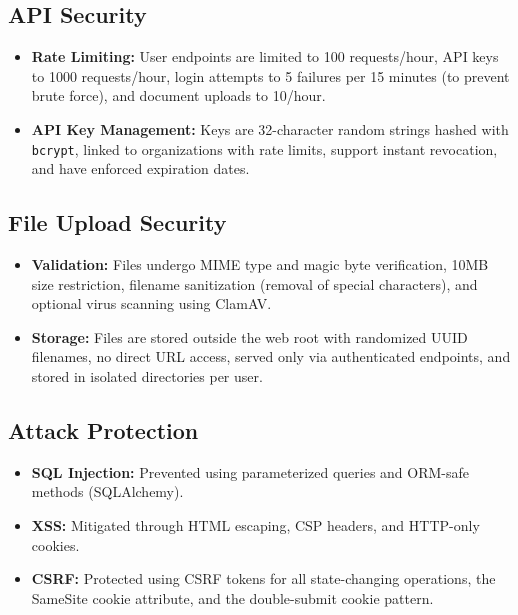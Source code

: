 \documentclass[12pt,a4paper]{article}
\begin{document}
\subsection{API Security}

\begin{itemize}
    \item \textbf{Rate Limiting:} User endpoints are limited to 100 requests/hour, API keys to 1000 requests/hour, login attempts to 5 failures per 15 minutes (to prevent brute force), and document uploads to 10/hour.
    \item \textbf{API Key Management:} Keys are 32-character random strings hashed with \texttt{bcrypt}, linked to organizations with rate limits, support instant revocation, and have enforced expiration dates.
\end{itemize}

\subsection{File Upload Security}

\begin{itemize}
    \item \textbf{Validation:} Files undergo MIME type and magic byte verification, 10MB size restriction, filename sanitization (removal of special characters), and optional virus scanning using ClamAV.
    \item \textbf{Storage:} Files are stored outside the web root with randomized UUID filenames, no direct URL access, served only via authenticated endpoints, and stored in isolated directories per user.
\end{itemize}

\subsection{Attack Protection}

\begin{itemize}
    \item \textbf{SQL Injection:} Prevented using parameterized queries and ORM-safe methods (SQLAlchemy).
    \item \textbf{XSS:} Mitigated through HTML escaping, CSP headers, and HTTP-only cookies.
    \item \textbf{CSRF:} Protected using CSRF tokens for all state-changing operations, the SameSite cookie attribute, and the double-submit cookie pattern.
\end{itemize}
\end{document}
